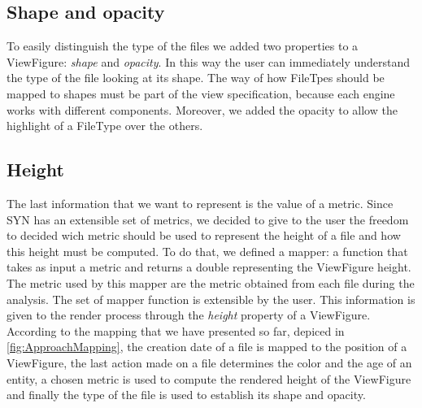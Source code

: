 \subsection*{Shape and opacity}
To easily distinguish the type of the files we added two properties to a ViewFigure: \textit{shape} and \textit{opacity}. 
In this way the user can immediately understand the type of the file looking at its shape. The way of how FileTpes should be mapped to shapes must be part of the view specification, because each engine works with different components. 
\bigbreak
Moreover, we added the opacity to allow the highlight of a FileType over the others. 

\subsection*{Height}
The last information that we want to represent is the value of a metric. Since SYN has an extensible set of metrics, we decided to give to the user the freedom to decided wich metric should be used to represent the height of a file and how this height must be computed. 
To do that, we defined a mapper: a function that takes as input a metric and returns a double representing the ViewFigure height. The metric used by this mapper are the metric obtained from each file during the analysis. The set of mapper function is extensible by the user. \bigbreak
This information is given to the render process through the \textit{height} property of a ViewFigure.
\bigbreak
According to the mapping that we have presented so far, depiced in \autoref{fig:ApproachMapping}, the creation date of a file is mapped to the position of a ViewFigure, the last action made on a file determines the color and the age of an entity, a chosen metric is used to compute the rendered height of the ViewFigure and finally the type of the file is used to establish its shape and opacity. 


